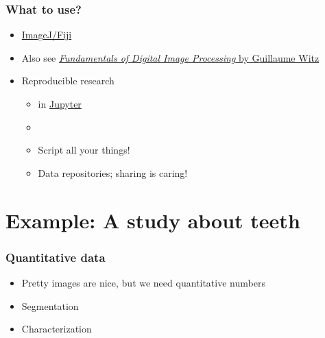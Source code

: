 \begin{frame}
		\frametitle{What to use?}
		\begin{itemize}
				\item \href{http://fiji.sc/}{ImageJ/Fiji}~\cite{Schindelin2012}
				\item Also see \href{https://ilias.unibe.ch/goto_ilias3_unibe_sess_3022928.html}{\emph{Fundamentals of Digital Image Processing} by Guillaume Witz}
				\item Reproducible research
						\begin{itemize}
								\item \href{https://www.python.org/}{\faPython} in \href{https://jupyter.org/}{Jupyter}~\cite{Kluyver2016}
								\item \href{https://git-scm.com/}{\faGit}
								\item Script all your things!
								\item Data repositories; \ie{} sharing is caring!
						\end{itemize}
		\end{itemize}
\end{frame}

\section{Example: A study about teeth}
\begin{frame}
		\frametitle{Quantitative data}
		\begin{itemize}
				\item Pretty images are nice, but we need quantitative numbers
				\item Segmentation
				\item Characterization
		\end{itemize}
\end{frame}

